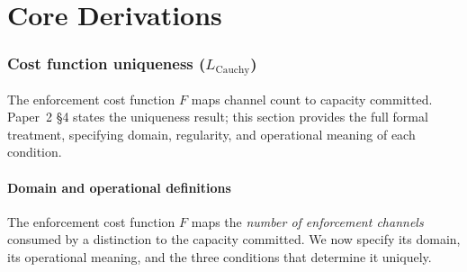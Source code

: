 \documentclass[11pt,a4paper]{article}
\theoremstyle{definition}
\begin{document}
\tableofcontents
\newpage



\part{Core Derivations}
\label{part:core}


\section{Cost function uniqueness ($L_{\mathrm{Cauchy}}$)}
\label{sec:cauchy_supp}

The enforcement cost function $F$ maps channel count to capacity committed.
Paper~2 \S4 states the uniqueness result; this section provides the full
formal treatment, specifying domain, regularity, and operational meaning
of each condition.

%
%


\subsection{Domain and operational definitions}
\label{sec:cauchy_domain}

The enforcement cost function $F$ maps the \emph{number of enforcement
channels} consumed by a distinction to the capacity committed.  We now
specify its domain, its operational meaning, and the three conditions
that determine it uniquely.
\end{document}
